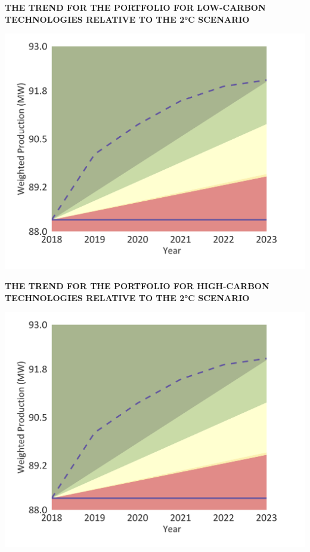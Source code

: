 \documentclass[10pt,twoside,table]{article}\usepackage[]{graphicx}\usepackage[]{color}
\begin{document}
	
		\begin{minipage}[t]{.49\linewidth}
		\textbf{THE TREND FOR THE PORTFOLIO FOR LOW-CARBON TECHNOLOGIES RELATIVE TO THE 2°C SCENARIO
		 }
		
		\includegraphics[trim = {0 0cm 0 0},width=1\linewidth]{CAFigures/Fig10}
		
	\end{minipage}	
	\hspace{.02\linewidth}
	\begin{minipage}[t]{.49\textwidth}
		\textbf{THE TREND FOR THE PORTFOLIO FOR HIGH-CARBON TECHNOLOGIES RELATIVE TO THE 2°C SCENARIO
		 }
		
		\includegraphics[trim = {0 0cm 0 0},width=1\linewidth]{CAFigures/Fig10}
				

	\end{minipage}
	
\end{document}
